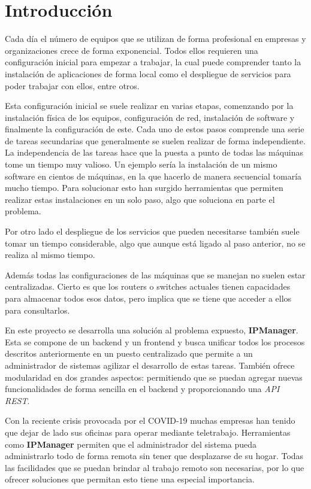 \chapter{Introducción}


Cada día el número de equipos que se utilizan de forma profesional en empresas y organizaciones crece de forma exponencial. Todos ellos requieren una configuración inicial para empezar a trabajar, la cual puede comprender tanto la instalación de aplicaciones de forma local como el despliegue de servicios para poder trabajar con ellos, entre otros.

Esta configuración inicial se suele realizar en varias etapas, comenzando por la instalación física de los equipos, configuración de red, instalación de software y finalmente la configuración de este. Cada uno de estos pasos comprende una serie de tareas secundarias que generalmente se suelen realizar de forma independiente. La independencia de las tareas hace que la puesta a punto de todas las máquinas tome un tiempo muy valioso. Un ejemplo sería la instalación de un mismo software en cientos de máquinas, en la que hacerlo de manera secuencial tomaría mucho tiempo. Para solucionar esto han surgido herramientas que permiten realizar estas instalaciones en un solo paso, algo que soluciona en parte el problema.

Por otro lado el despliegue de los servicios que pueden necesitarse también suele tomar un tiempo considerable, algo que aunque está ligado al paso anterior, no se realiza al mismo tiempo.

Además todas las configuraciones de las máquinas que se manejan no suelen estar centralizadas. Cierto es que los routers o switches actuales tienen capacidades para almacenar todos esos datos, pero implica que se tiene que acceder a ellos para consultarlos.

\smallskip
En este proyecto se desarrolla una solución al problema expuesto, \textbf{IPManager}. Esta se compone de un backend y un frontend y busca unificar todos los procesos descritos anteriormente en un puesto centralizado que permite a un administrador de sistemas agilizar el desarrollo de estas tareas. También ofrece modularidad en dos grandes aspectos: permitiendo que se puedan agregar nuevas funcionalidades de forma sencilla en el backend y proporcionando una \textit{API REST}.

Con la reciente crisis provocada por el COVID-19 muchas empresas han tenido que dejar de lado sus oficinas para operar mediante teletrabajo. Herramientas como \textbf{IPManager} permiten que el administrador del sistema pueda administrarlo todo de forma remota sin tener que desplazarse de su hogar. Todas las facilidades que se puedan brindar al trabajo remoto son necesarias, por lo que ofrecer soluciones que permitan esto tiene una especial importancia.

